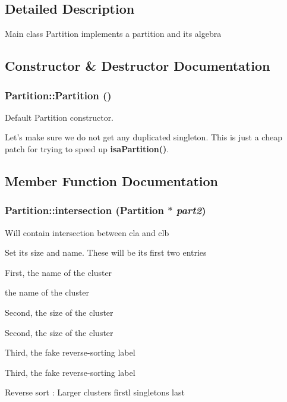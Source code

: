 \subsection{Detailed Description}
Main class Partition implements a partition and its algebra 



\subsection{Constructor \& Destructor Documentation}
\subsubsection{\setlength{\rightskip}{0pt plus 5cm}Partition::Partition ()}\label{classPartition_a0}


Default Partition constructor. 

Let's make sure we do not get any duplicated singleton. This is just a cheap patch for trying to speed up {\bf isa\-Partition()}. 

\subsection{Member Function Documentation}
\subsubsection{ Partition::intersection ({\bf Partition} $\ast$ {\em part2})}\label{classPartition_a30}


Will contain intersection between cla and clb

Set its size and name. These will be its first two entries

First, the name of the cluster

the name of the cluster

Second, the size of the cluster

Second, the size of the cluster

Third, the fake reverse-sorting label

Third, the fake reverse-sorting label

Reverse sort : Larger clusters firstl singletons last

